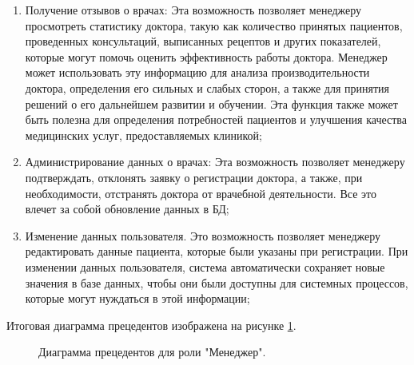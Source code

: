 \documentclass[14pt]{extreport}
\begin{document}
        \begin{enumerate}
            \item Получение отзывов о врачах: Эта возможность позволяет менеджеру %
            просмотреть статистику доктора, такую как количество принятых пациентов, %
            проведенных консультаций, выписанных рецептов и других показателей, которые %
            могут помочь оценить эффективность работы доктора. Менеджер может использовать %
            эту информацию для анализа производительности доктора, определения его сильных и %
            слабых сторон, а также для принятия решений о его дальнейшем развитии и обучении. %
            Эта функция также может быть полезна для определения потребностей пациентов и %
            улучшения качества медицинских услуг, предоставляемых клиникой;
            \item Администрирование данных о врачах: Эта возможность позволяет%
             менеджеру подтверждать, отклонять заявку о регистрации доктора, %
             а также, при необходимости, отстранять доктора от врачебной деятельности. %
             Все это влечет за собой обновление данных в БД;
            \item Изменение данных пользователя. Это возможность позволяет менеджеру %
            редактировать данные пациента, которые были указаны при регистрации. %
            При изменении данных пользователя, система автоматически сохраняет новые %
            значения в базе данных, чтобы они были доступны для системных процессов, %
            которые могут нуждаться в этой информации;
        \end{enumerate}
    
        Итоговая диаграмма прецедентов изображена на рисунке \ref{manager_uml}.

        \begin{figure}[H]%
            \centering
            \caption{Диаграмма прецедентов для роли "Менеджер".} \label{manager_uml}
        \end{figure} 
\end{document}

